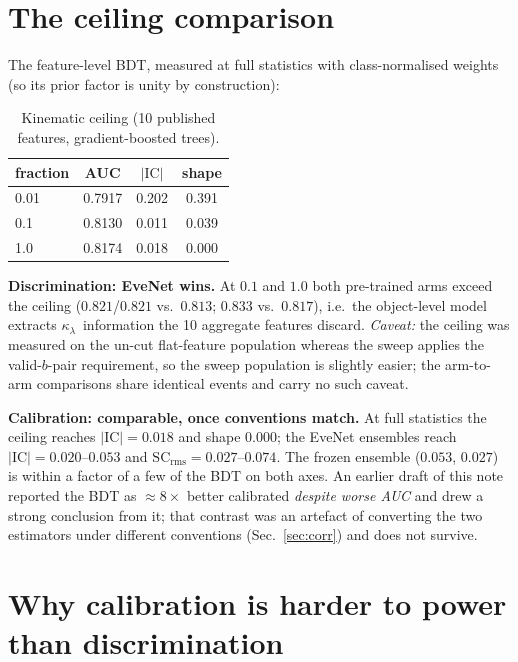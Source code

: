 \documentclass[11pt]{article}
\newcommand{\kl}{\ensuremath{\kappa_\lambda}}
\newcommand{\IC}{\ensuremath{\mathrm{IC}}}
\newcommand{\SCr}{\ensuremath{\mathrm{SC_{rms}}}}
\begin{document}
\section{The ceiling comparison}
\label{sec:ceiling}

The feature-level BDT, measured at full statistics with class-normalised weights (so its
prior factor is unity by construction):

\begin{table}[h]
\centering\small
\begin{tabular}{@{}lccc@{}}
\toprule
fraction & AUC & $|\IC|$ & shape \\
\midrule
0.01 & 0.7917 & 0.202 & 0.391 \\
0.1  & 0.8130 & 0.011 & 0.039 \\
1.0  & 0.8174 & 0.018 & 0.000 \\
\bottomrule
\end{tabular}
\caption{Kinematic ceiling (10 published features, gradient-boosted trees).}
\label{tab:ceilingtab}
\end{table}

\textbf{Discrimination: EveNet wins.} At $0.1$ and $1.0$ both pre-trained arms exceed the
ceiling ($0.821$/$0.821$ vs.\ $0.813$; $0.833$ vs.\ $0.817$), i.e.\ the object-level model
extracts \kl\ information the 10 aggregate features discard. \emph{Caveat:} the ceiling was
measured on the un-cut flat-feature population whereas the sweep applies the valid-$b$-pair
requirement, so the sweep population is slightly easier; the arm-to-arm comparisons share
identical events and carry no such caveat.

\textbf{Calibration: comparable, once conventions match.} At full statistics the ceiling
reaches $|\IC|=0.018$ and shape $0.000$; the EveNet ensembles reach $|\IC|=0.020$--$0.053$
and $\SCr=0.027$--$0.074$. The frozen ensemble ($0.053$, $0.027$) is within a factor of a
few of the BDT on both axes. An earlier draft of this note reported the BDT as
${\approx}8\times$ better calibrated \emph{despite worse AUC} and drew a strong conclusion
from it; that contrast was an artefact of converting the two estimators under different
conventions (Sec.~\ref{sec:corr}) and does not survive.

\section{Why calibration is harder to power than discrimination}
\label{sec:power}
\end{document}
